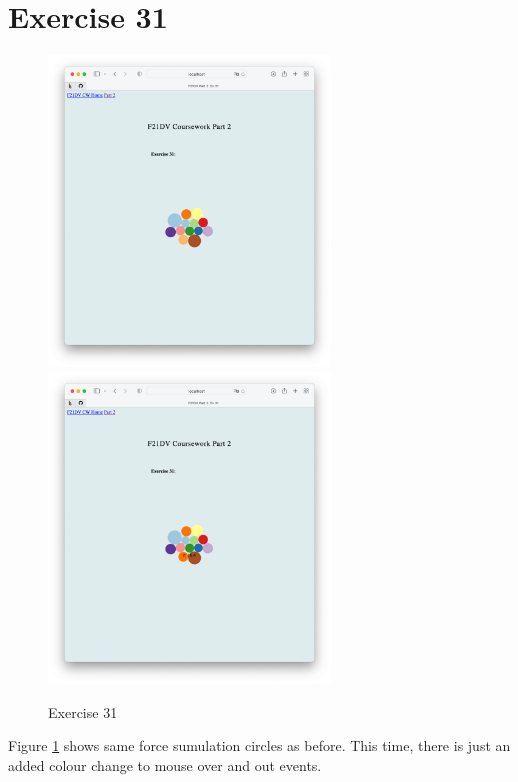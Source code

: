 \documentclass{scrreprt}
\begin{document}
\newpage
\section{Exercise 31}
\begin{figure}[!ht]
    \centering
    \includegraphics[width = 7.5cm]{images/ex31_1.png}
    \includegraphics[width = 7.5cm]{images/ex31_2.png}
    \label{fig:ex31}
    \caption{Exercise 31}
\end{figure}
\FloatBarrier
% 
Figure \ref{fig:ex31} shows same force sumulation circles as before. This time, there is just an added colour change to mouse over and out events.

\newpage
\end{document}
